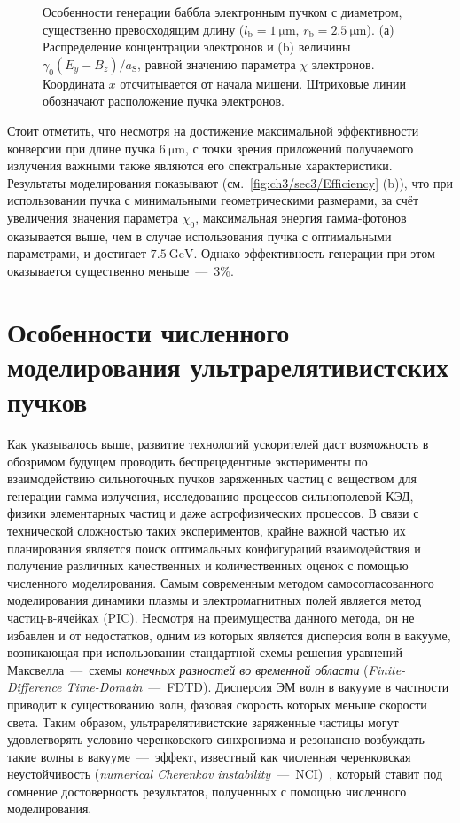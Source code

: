 \begin{figure}[ht]
    \caption[Особенности генерации баббла электронным пучком с диаметром, существенно превосходящим длину]{Особенности генерации баббла электронным пучком с диаметром, существенно превосходящим длину ($l_\mathrm{b} = \SI{1}{\um}$, $r_\mathrm{b} = \SI{2.5}{\um}$). (а) Распределение концентрации электронов и (b) величины $\gamma_0 \left( E_y - B_z \right) / a_\mathrm{S}$, равной значению параметра $\chi$ электронов.
    Координата $x$ отсчитывается от начала мишени.
    Штриховые линии обозначают расположение пучка электронов.}
    \label{fig:ch3/sec3/Pancake}
\end{figure}

Стоит отметить, что несмотря на достижение максимальной эффективности конверсии при длине пучка $\SI{6}{\um}$, с точки зрения приложений получаемого излучения важными также являются его спектральные характеристики.
Результаты моделирования показывают (см.~\ref{fig:ch3/sec3/Efficiency} (b)), что при использовании пучка с минимальными геометрическими размерами, за счёт увеличения значения параметра $\chi_0$, максимальная энергия гамма-фотонов оказывается выше, чем в случае использования пучка с оптимальными параметрами, и достигает $\SI{7.5}{\giga\electronvolt}$.
Однако эффективность генерации при этом оказывается существенно меньше~---~3\%.

\section{Особенности численного моделирования ультрарелятивистских пучков}
\label{sec:ch3/sec4}

Как указывалось выше, развитие технологий ускорителей даст возможность в обозримом будущем проводить беспрецедентные эксперименты по взаимодействию сильноточных пучков заряженных частиц с веществом для генерации гамма-излучения, исследованию процессов сильнополевой КЭД, физики элементарных частиц и даже астрофизических процессов.
В связи с технической сложностью таких экспериментов, крайне важной частью их планирования является поиск оптимальных конфигураций взаимодействия и получение различных качественных и количественных оценок с помощью численного моделирования.
Самым современным методом самосогласованного моделирования динамики плазмы и электромагнитных полей является метод частиц-в-ячейках (PIC).
Несмотря на преимущества данного метода, он не избавлен и от недостатков, одним из которых является дисперсия волн в вакууме, возникающая при использовании стандартной схемы решения уравнений Максвелла~---~схемы \textit{конечных разностей во временной области} (\textit{Finite-Difference Time-Domain}~---~FDTD).
Дисперсия ЭМ волн в вакууме в частности приводит к существованию волн, фазовая скорость которых меньше скорости света.
Таким образом, ультрарелятивистские заряженные частицы могут удовлетворять условию черенковского синхронизма и резонансно возбуждать такие волны в вакууме~---~эффект, известный как {численная черенковская неустойчивость} (\textit{numerical Cherenkov instability}~---~NCI)~\cite{Birdsall1989, Meyers2014, Blinne2017}, который ставит под сомнение достоверность результатов, полученных с помощью численного моделирования.

